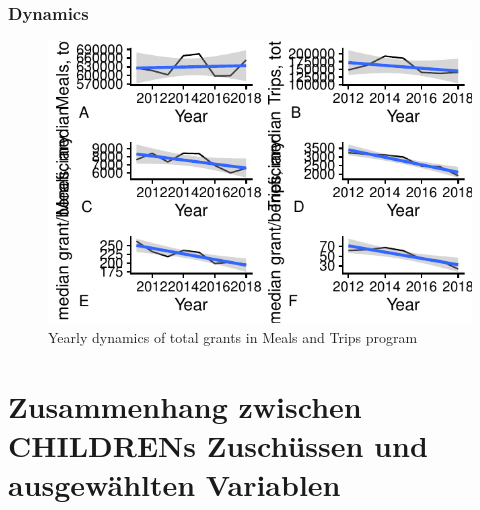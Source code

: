 \begin{frame}[fragile]
\frametitle{Dynamics}
 \begin{figure}
   \caption{Yearly dynamics of total grants in Meals and Trips program}
   \label{totalGrantsDyn}
\begin{knitrout}\footnotesize
{}\color{fgcolor}

{\centering \includegraphics[width=\maxwidth]{figure/beamer-GrantTrend-1} 

}



\end{knitrout}
\end{figure}
\end{frame}


\section[Zusammenhang Zuschüsse \& ausgewählte Variablen]{Zusammenhang zwischen CHILDRENs Zuschüssen und ausgewählten Variablen}


